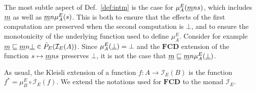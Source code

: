 \documentclass[11pt,oneside,draft]{book}
\theoremstyle{definition}
\newcommand{\ul}[1]{%
  \underline{\smash{#1}}
}
\begin{document}
%


The most subtle aspect of Def.~\ref{def:intm}
is the case for $\mu^E_A(\ul{m} n s)$,
which includes $\ul{m}$ as well as $\ul{m} n \mu^E_A(s)$.
This is both
to ensure that the effects of the first computation are preserved
when the second computation is $\bot$, and
to ensure the monotonicity of the underlying function
used to define $\mu^E_A$.
Consider for example
$\ul{m} \sqsubseteq
 \ul{m} n \ul{\bot} \in \bar{P}_E(\mathcal{I}_E(A))$.
Since $\mu^E_A(\ul{\bot}) = \bot$ and
the $\mathbf{FCD}$ extension
of the function $s \mapsto \ul{m} n s$
preserves $\bot$,
it is not the case that
$\ul{m} \sqsubseteq
 \ul{m} n \mu^E_A(\ul{\bot})$.

As usual,
the Kleisli extension of a function $f : A \rightarrow \mathcal{I}_E(B)$
is the function $f^* = \mu^E_B \circ \mathcal{I}_E(f)$.
We extend the notations used for $\mathbf{FCD}$
to the monad $\mathcal{I}_E$.

\end{document}
